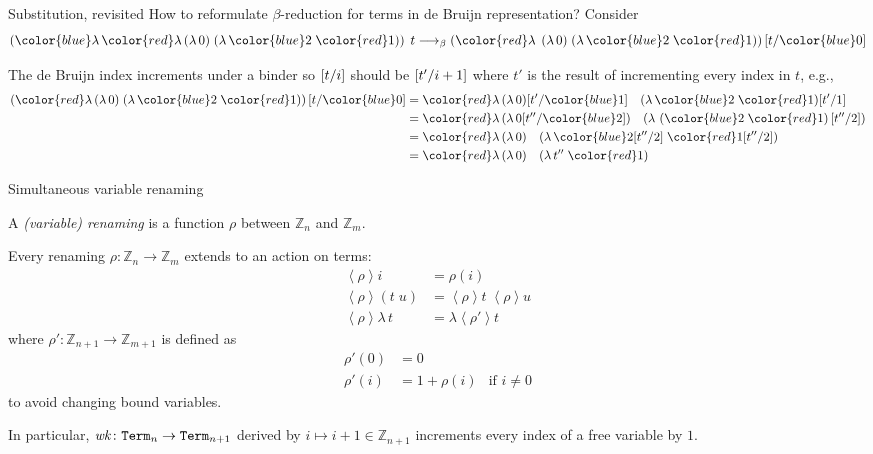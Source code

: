 \begin{frame}{Substitution, revisited}
  How to reformulate $\beta$-reduction for terms in de Bruijn representation? 
  Consider
  \[
    \left({\color{blue}\lambda}\, {\color{red}\lambda}\,(\lambda\,0) \;(\lambda\,{\color{blue} 2}\;{\color{red}1})\right)\;t
  \longrightarrow_{\beta}
  \left({\color{red}\lambda}\, \;(\lambda\,0) \;(\lambda\,{\color{blue} 2}\;{\color{red}1})\right)\subst{t}{\color{blue}0}
  \]

  The de Bruijn index increments under a binder so $[{t}/{i}]$ should be $[{t'}/{i+1}]$ where $t'$ is the result of incrementing every index in $t$, e.g., 
  \begin{align*}
      \left({\color{red}\lambda}\, (\lambda\,0) \;(\lambda\,{\color{blue} 2}\;{\color{red}1})\right)\subst{t}{\color{blue}0}
      & = 
      {\color{red}\lambda}\, (\lambda\,0)\subst{t'}{\color{blue}1} \quad(\lambda\,{\color{blue} 2}\;{\color{red}1})\subst{t'}{1} \\
      & =
      {\color{red}\lambda}\, (\lambda\,0\subst{t''}{\color{blue}2}) \quad(\lambda\,\left({\color{blue} 2}\;{\color{red}1}\right)\subst{t''}{2}) \\
      & =
      {\color{red}\lambda}\, (\lambda\,0) \quad(\lambda\, {\color{blue} 2}\subst{t''}{2}\;{\color{red}1}\subst{t''}{2}) \\
      & = 
      {\color{red}\lambda}\, (\lambda\,0) \quad(\lambda\, t''\;{\color{red}1})
  \end{align*}
  
\end{frame}


\begin{frame}{Simultaneous variable renaming}
  \begin{definition}
    A \emph{(variable) renaming} is a function $\rho$ between $\mathbb{Z}_n$ and $\mathbb{Z}_m$. 
  \end{definition}
  Every renaming $\rho\colon \mathbb{Z}_n \to \mathbb{Z}_m$ extends to an action on terms:
  \begin{align*}
    \left< \rho \right> i                 & = \rho(i)                                  \\
    \left< \rho \right> \left(t\;u\right) & = \left<\rho\right>t \; \left<\rho\right>u \\
    \left< \rho \right> \lambda\,t        & = \lambda\left< \rho' \right> t
  \end{align*}
  where $\rho' \colon \mathbb{Z}_{n+1} \to \mathbb{Z}_{m+1}$ is defined as 
  \begin{align*}
    \rho'(0) & = 0 \\
    \rho'(i) & = 1 + \rho(i) & \text{if $i \neq 0$}
  \end{align*}
  to avoid changing bound variables. 
  
  In particular, $\mathit{wk}\colon \mathtt{Term}_{n} \to \mathtt{Term}_{n+1}$ derived by $i \mapsto i+1 \in \mathbb{Z}_{n+1}$ increments every index of a free variable by $1$.
\end{frame}

